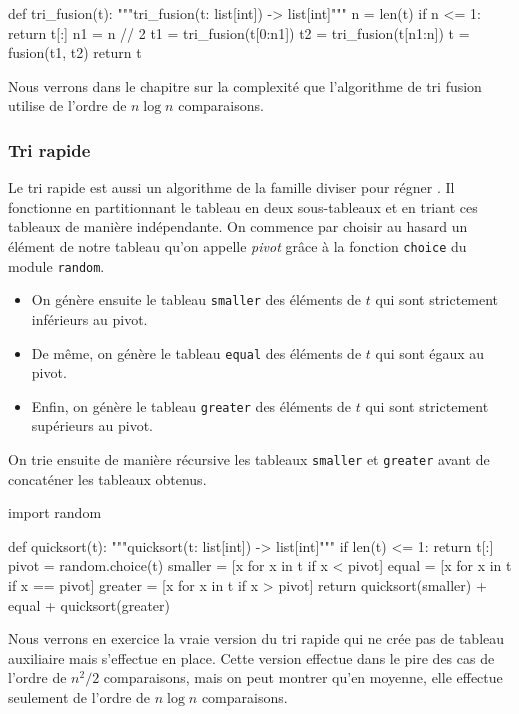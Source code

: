 \documentclass{magnoliaold}
\begin{document}
\begin{pythoncode}
def tri_fusion(t):
    """tri_fusion(t: list[int]) -> list[int]"""
    n = len(t)
    if n <= 1:
        return t[:]
    n1 = n // 2
    t1 = tri_fusion(t[0:n1])
    t2 = tri_fusion(t[n1:n])
    t = fusion(t1, t2)
    return t
\end{pythoncode}
\noindent
Nous verrons dans le chapitre sur la complexité que l'algorithme de tri fusion utilise de l'ordre de $n\log n$ comparaisons.

\subsubsection{Tri rapide}

Le tri rapide est aussi un algorithme de la famille \og diviser pour régner \fg.
Il fonctionne en partitionnant le tableau en deux sous-tableaux et en triant ces
tableaux de manière indépendante. On commence par choisir au hasard un élément
de notre tableau qu'on appelle \emph{pivot} grâce à la fonction \verb!choice! du
module \verb!random!.
\begin{itemize}
\item On génère ensuite le tableau \verb!smaller! des éléments de $t$ qui sont
  strictement inférieurs au pivot.
\item De même, on génère le tableau \verb!equal! des éléments de $t$ qui sont
  égaux au pivot.
\item Enfin, on génère le tableau \verb!greater! des éléments de $t$ qui sont
  strictement supérieurs au pivot.
\end{itemize}
On trie ensuite de manière récursive les tableaux \verb!smaller! et \verb!greater!
avant de concaténer les tableaux obtenus.

\begin{pythoncode}
import random 

def quicksort(t):
    """quicksort(t: list[int]) -> list[int]"""
    if len(t) <= 1:
        return t[:]
    pivot = random.choice(t)
    smaller = [x for x in t if x < pivot]
    equal = [x for x in t if x == pivot]
    greater = [x for x in t if x > pivot]
    return quicksort(smaller) + equal + quicksort(greater)
\end{pythoncode}
\noindent
Nous verrons en exercice la \og vraie \fg version du tri rapide qui ne crée pas de tableau
auxiliaire mais s'effectue en place. Cette version effectue dans le pire des cas de l'ordre de $n^2/2$ comparaisons,
mais on peut montrer qu'en moyenne, elle effectue seulement de l'ordre de $n \log n$
comparaisons.
\end{document}
